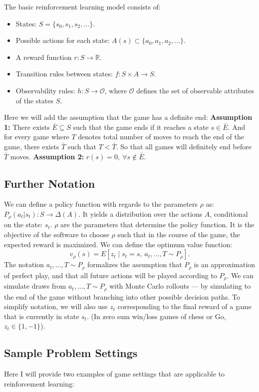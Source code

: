 \documentclass[11pt]{article}
\begin{document}
The basic reinforcement learning model consists of:
\begin{itemize}
\item States: $S=\{s_0,s_1,s_2,\dots\}$.
\item Possible actions for each state: $A(s)\subset\{a_0,a_1,a_2,\dots\}$.
\item A reward function $r:S\to\mathbb{R}$.
\item Transition rules between states: $f:S\times A\to S$.
\item Observability rules: $h:S\to\mathcal O$, where $\mathcal O$ defines the set of observable attributes of the
states $S$.
\end{itemize}
Here we will add the assumption that the game has a definite end:
\medskip
\noindent\textbf{Assumption 1:} There exists $\bar E\subseteq S$ such that the game ends if it reaches
a state $s\in\bar E$. And for every game where $T$ denotes total number of moves to reach the
end of the game, there exists $\bar T$ such that $T<\bar T$. So that all games will definitely end before
$\bar T$ moves.
\medskip
\noindent\textbf{Assumption 2:} $r(s)=0,\ \forall s\notin \bar E$.

\subsection{Further Notation}
We can define a policy function with regards to the parameters $\rho$ as: $P_\rho(a_t|s_t):S\to\Delta(A)$.
It yields a distribution over the actions $A$, conditional on the state: $s_t$.
$\rho$ are the parameters that determine the policy function. It is the objective of the software
to choose $\rho$ such that in the course of the game, the expected reward is maximized.
We can define the optimum value function:
\[
v_\rho(s)=E\left[z_t\mid s_t=s,\ a_t,\dots,T\sim P_\rho\right].
\]
The notation $a_t,\dots,T\sim P_\rho$ formalizes the assumption that $P_\rho$ is an approximation of perfect
play, and that all future actions will be played according to $P_\rho$. We can simulate draws from
$a_t,\dots,T\sim P_\rho$ with Monte Carlo rollouts --- by simulating to the end of the game without branching
into other possible decision paths.
To simplify notation, we will also use $z_t$ corresponding to the final reward of a game that is
currently in state $s_t$. (In zero sum win/loss games of chess or Go, $z_t\in\{1,-1\}$).

\subsection{Sample Problem Settings}
Here I will provide two examples of game settings that are applicable to reinforcement learning:
\end{document}
